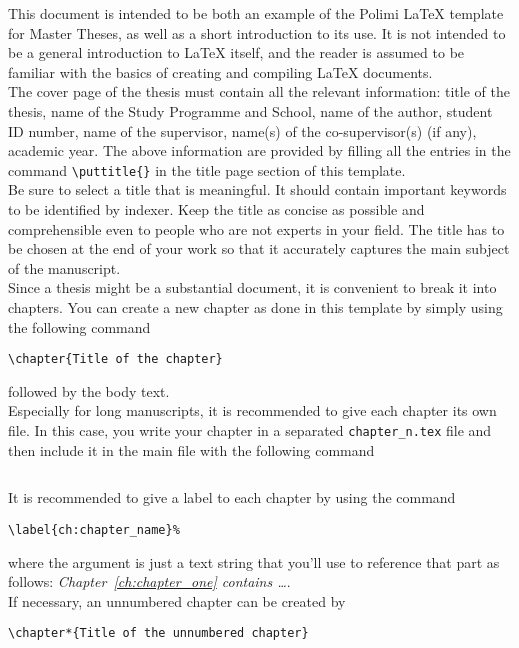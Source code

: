 \documentclass{Configuration_Files/PoliMi3i_thesis}
\begin{document}
This document is intended to be both an example of the Polimi \LaTeX{} template for Master Theses,
as well as a short introduction to its use. It is not intended to be a general introduction to \LaTeX{} itself,
and the reader is assumed to be familiar with the basics of creating and compiling \LaTeX{} documents. 
\\
The cover page of the thesis must contain all the relevant information:
title of the thesis, name of the Study Programme and School, name of the author,
student ID number, name of the supervisor, name(s) of the co-supervisor(s) (if any), academic year.
The above information are provided by filling all the entries in the command \verb|\puttitle{}|
in the title page section of this template.
\\
Be sure to select a title that is meaningful.
It should contain important keywords to be identified by indexer.
Keep the title as concise as possible and comprehensible even to people who are not experts in your field.
The title has to be chosen at the end of your work so that it accurately captures the main subject of the manuscript. 
\\
Since a thesis might be a substantial document, it is convenient to break it into chapters.
You can create a new chapter as done in this template by simply using the following command
\begin{verbatim}
\chapter{Title of the chapter}
\end{verbatim}
followed by the body text.
\\
Especially for long manuscripts, it is recommended to give each chapter its own file.
In this case, you write your chapter in a separated \verb|chapter_n.tex| file
and then include it in the main file with the following command
\begin{verbatim}

\end{verbatim}
It is recommended to give a label to each chapter by using the command
\begin{verbatim}
\label{ch:chapter_name}%
\end{verbatim}
where the argument is just a text string that you'll use to reference that part
as follows: \textit{Chapter~\ref{ch:chapter_one} contains   \dots}.\\
If necessary, an unnumbered chapter can be created by
\begin{verbatim}
\chapter*{Title of the unnumbered chapter}
\end{verbatim}
\end{document}
